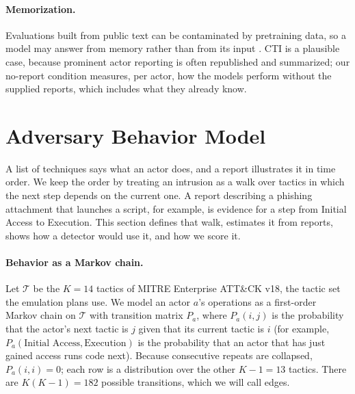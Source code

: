\documentclass[letterpaper]{article} %
\begin{document}
\paragraph{Memorization.} Evaluations built from public text can be contaminated by pretraining data, so a model may answer from memory rather than from its input \citep{sainz2023nlptrouble,golchin2024timetravel}. CTI is a plausible case, because prominent actor reporting is often republished and summarized; our no-report condition measures, per actor, how the models perform without the supplied reports, which includes what they already know.

\section{Adversary Behavior Model}
A list of techniques says what an actor does, and a report illustrates it in time order. We keep the order by treating an intrusion as a walk over tactics in which the next step depends on the current one. A report describing a phishing attachment that launches a script, for example, is evidence for a step from Initial Access to Execution. This section defines that walk, estimates it from reports, shows how a detector would use it, and how we score it.

\paragraph{Behavior as a Markov chain.} Let $\mathcal{T}$ be the $K=14$ tactics of MITRE Enterprise ATT\&CK v18, the tactic set the emulation plans use. We model an actor $a$'s operations as a first-order Markov chain on $\mathcal{T}$ with transition matrix $P_a$, where $P_a(i,j)$ is the probability that the actor's next tactic is $j$ given that its current tactic is $i$ (for example, $P_a(\text{Initial Access}, \text{Execution})$ is the probability that an actor that has just gained access runs code next). Because consecutive repeats are collapsed, $P_a(i,i)=0$; each row is a distribution over the other $K-1=13$ tactics. There are $K(K-1)=182$ possible transitions, which we will call edges.
\end{document}
